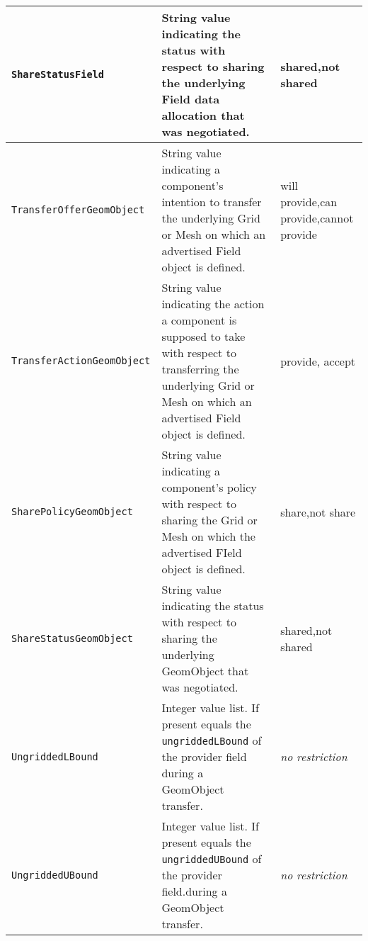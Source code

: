 \begin{longtable}{|p{}|p{}|p{}|}
     {\tt ShareStatusField} & String value indicating the status with respect to sharing the underlying Field data allocation that was negotiated.& shared,\newline not shared\\ \hline
     {\tt TransferOfferGeomObject} & String value indicating a component's intention to transfer the underlying Grid or Mesh on which an advertised Field object is defined.& will provide,\newline can provide,\newline cannot provide\\ \hline
     {\tt TransferActionGeomObject} & String value indicating the action a component is supposed to take with respect to transferring the underlying Grid or Mesh on which an advertised Field object is defined.& provide, accept\\ \hline
     {\tt SharePolicyGeomObject} & String value indicating a component's policy with respect to sharing the Grid or Mesh on which the advertised FIeld object is defined.& share,\newline not share\\ \hline
     {\tt ShareStatusGeomObject} & String value indicating the status with respect to sharing the underlying GeomObject that was negotiated.& shared,\newline not shared\\ \hline
     {\tt UngriddedLBound} & Integer value list. If present equals the {\tt ungriddedLBound} of the provider field during a GeomObject transfer. & {\em no restriction}\\ \hline
     {\tt UngriddedUBound} & Integer value list. If present equals the {\tt ungriddedUBound} of the provider field.during a GeomObject transfer. & {\em no restriction}\\ \hline
     \hline
\end{longtable}
